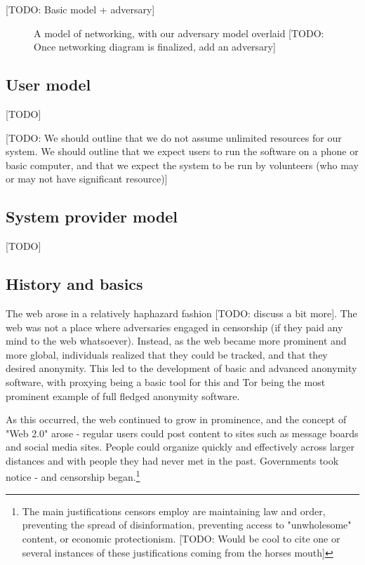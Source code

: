 \documentclass[12pt]{report}
\begin{document}
[TODO: Basic model + adversary]

\begin{figure}
\begin{center}
{}
\end{center}
\caption{A model of networking, with our adversary model overlaid [TODO: Once networking diagram is finalized, add an adversary]}
\end{figure}

\subsection{User model}

[TODO]

[TODO: We should outline that we do not assume unlimited resources for our system. We should outline that we expect users to run the software on a phone or basic computer, and that we expect the system to be run by volunteers (who may or may not have significant resource)]

\subsection{System provider model}

[TODO]

\subsection{History and basics}

The web arose in a relatively haphazard fashion [TODO: discuss a bit more]. The web was not a place where adversaries engaged in censorship (if they paid any mind to the web whatsoever). Instead, as the web became more prominent and more global, individuals realized that they could be tracked, and that they desired anonymity. This led to the development of basic and advanced anonymity software, with proxying being a basic tool for this and Tor being the most prominent example of full fledged anonymity software.

As this occurred, the web continued to grow in prominence, and the concept of "Web 2.0" arose - regular users could post content to sites such as message boards and social media sites. People could organize quickly and effectively across larger distances and with people they had never met in the past. Governments took notice - and censorship began.\footnote{The main justifications censors employ are maintaining law and order, preventing the spread of disinformation, preventing access to "unwholesome" content, or economic protectionism. [TODO: Would be cool to cite one or several instances of these justifications coming from the horses mouth]}
\end{document}
